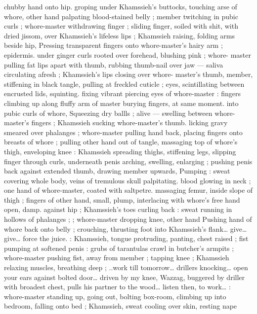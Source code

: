 chubby hand onto hip. groping under Khamssieh's buttocks, touching 
arse of whore, other hand palpating blood-stained belly ; member 
twitching in pubic curls ; whore-master withdrawing finger ; sliding 
finger, soiled with shit, with dried jissom, over Khamssieh's lifeless 
lips ; Khamssieh raising, folding arms beside hip, Pressing 
transparent fingers onto whore-master's hairy arm ; epidermis. 
under ginger curls rooted over forehead, blushing pink ; whore- 
master pulling fat lips apart with thumb, rubbing thumb-nail over jaw 
--- saliva circulating afresh ; Khamssieh's lips closing over whore- 
master's thumb, member, stiffening in black tangle, pulling at 
freckled cuticle ; eyes, scintillating between encrusted lids, squinting. 
fixing vibrant piercing eyes of whore-master : fingers climbing up 
along fluffy arm of master burying fingers, at same moment. into 
pubic curls of whore, Squeezing dry ballls ; alive --- swelling between 
whore-master's fingers ; Khamssieh sucking whore-master's thumb. 
licking gravy smeared over phalanges ; whore-master pulling hand 
back, placing fingers onto breasts of whore ; pulling other hand out 
of tangle, massaging top of whore's thigh, enveloping knee : 
Khamssieh spreading thighs, stiffening legs, slipping finger through 
curls, underneath penis arching, swelling, enlarging ; pushing penis 
back against extended thumb, drawing member upwards, Pumping : 
sweat covering whole body, veins of tremulous skull palpitating. 
blood glowing in neck ; one hand of whore-master, coated with 
saltpetre. massaging femur, inside slope of thigh ; fingers of other 
hand, small, plump, interlacing with whore's free hand open, damp. 
against hip ; Khamssieh's toes curling back : sweat running in 
hollows of phalanges ; ; whore-master dropping knee, other hand 
Pushing hand of whore back onto belly ; crouching, thrusting foot 
into Khamssieh's flank{\ldots} {\gl} give{\ldots} give{\ldots} force the juice. {\gr} : 
Khamssieh, tongue protruding, panting, chest raised ; fist pumping 
at softened penis{\td} : {\gl}{\td} grubs of tarantulas crawl in butcher's 
armpits{\td} {\gr} ; whore-master pushing fist, away from member ; tapping 
knee ; Khamssieh relaxing muscles, breathing deep ; {\gl}..work till 
tomorrow{\ldots} drillers knocking{\ldots} open your ears against bolted door{\ldots} 
driven by my knee, Wazzag, buggered by driller with broadest chest, 
pulls his partner to the wood{\ldots} listen then, to work{\ldots}{\gr} : whore-master 
standing up, going out, bolting box-room, climbing up into bedroom, 
falling onto bed ; Khamssieh, sweat cooling over skin, resting nape 

